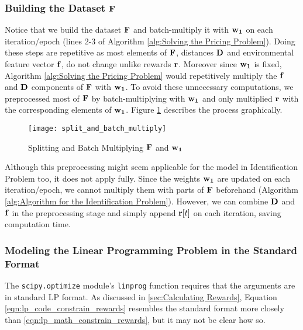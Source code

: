 \begin{appendices}
    \subsubsection{Building the Dataset $\mathbf{F}$}
    Notice that we build the dataset $\mathbf{F}$ and batch-multiply it with $\mathbf{w_1}$ on each iteration/epoch (lines 2-3 of Algorithm \ref{alg:Solving the Pricing Problem}). Doing these steps are repetitive as most elements of $\mathbf{F}$, distances $\mathbf{D}$ and environmental feature vector $\mathbf{f}$, do not change unlike rewards $\mathbf{r}$. Moreover since $\mathbf{w_1}$ is fixed, Algorithm \ref{alg:Solving the Pricing Problem} would repetitively multiply the $\mathbf{f}$ and $\mathbf{D}$ components of $\mathbf{F}$ with $\mathbf{w_1}$. To avoid these unnecessary computations, we preprocessed most of $\mathbf{F}$ by batch-multiplying with $\mathbf{w_1}$ and only multiplied $\mathbf{r}$ with the corresponding elements of $\mathbf{w_1}$. Figure \ref{fig:Splitting and Batch Multiplying F and w1} describes the process graphically.\\
    \begin{figure}[!htbp]
        \centering
        \texttt{[image: split\_and\_batch\_multiply]}
        \caption{Splitting and Batch Multiplying $\mathbf{F}$ and $\mathbf{w_1}$}
        \label{fig:Splitting and Batch Multiplying F and w1}
    \end{figure}    
    Although this preprocessing might seem applicable for the model in Identification Problem too, it does not apply fully. Since the weights $\mathbf{w_1}$ are updated on each iteration/epoch, we cannot multiply them with parts of $\mathbf{F}$ beforehand (Algorithm \ref{alg:Algorithm for the Identification Problem}). However, we can combine $\mathbf{D}$ and $\mathbf{f}$ in the preprocessing stage and simply append $\mathbf{r}[t]$ on each iteration, saving computation time.
    
    \subsubsection{Modeling the Linear Programming Problem in the Standard Format}
    The \texttt{scipy.optimize} module's \texttt{linprog} function requires that the arguments are in standard LP format. As discussed in \cref{sec:Calculating Rewards}, Equation \ref{eqn:lp_code_constrain_rewards} resembles the standard format more closely than \ref{eqn:lp_math_constrain_rewards}, but it may not be clear how so.\\
    

\end{appendices}
